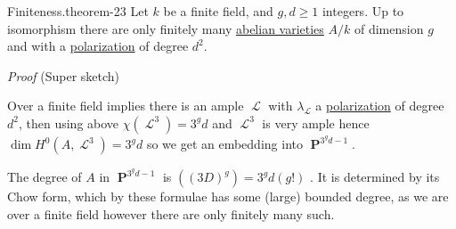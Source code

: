 \documentclass[10pt,]{book}
\makeatletter
\renewcommand*{\proofname}{Proof}
\renewenvironment{proof}[1][\proofname]{\par
  \pushQED{\qed}%
  \normalfont \topsep6\p@\@plus6\p@\relax
  \trivlist
  \item\relax
    {\itshape
    #1\@addpunct{.}}\hspace\labelsep\ignorespaces
}{%
  \popQED\endtrivlist\@endpefalse
}
\numberwithin{equation}{section}
\newcommand{\sheaf}[1]{\operatorname{\mathcal{#1}}}
\DeclareMathOperator{\PP}{\mathbf{P}}
\makeatother
\begin{document}
\begin{theorem}{Finiteness.}{}{theorem-23}%
\hypertarget{p-258}{}%
Let \(k\) be a finite field, and   \(g,d\ge 1\) integers. Up to isomorphism there are only finitely many \hyperref[def-buntes-abvar]{abelian varieties} \(A/k\) of dimension \(g\) and with a \hyperref[def-polarization]{polarization} of degree \(d^2\).%
\end{theorem}
\begin{proof}\hypertarget{proof-45}{}
\hypertarget{p-259}{}%
(Super sketch)%
\par
\hypertarget{p-260}{}%
Over a finite field implies there is an ample \(\sheaf L\) with \(\lambda_{\sheaf L}\) a \hyperref[def-polarization]{polarization} of degree \(d^2\), then using above \(\chi(\sheaf L^3) = 3^g d\) and \(\sheaf L^3\) is very ample hence \(\dim H^0(A, \sheaf L^3) = 3^g d\) so we get an embedding into \(\PP^{3^g d - 1}\).%
\par
\hypertarget{p-261}{}%
The degree of \(A\) in \(\PP^{3^g d - 1}\) is \(((3D)^g) = 3^g d(g!)\) . It is determined by its Chow form, which by these formulae has some (large) bounded degree, as we are over a finite field however there are only finitely many such.%
\end{proof}
%
%
\typeout{************************************************}
\typeout{************************************************}
%
\end{document}
